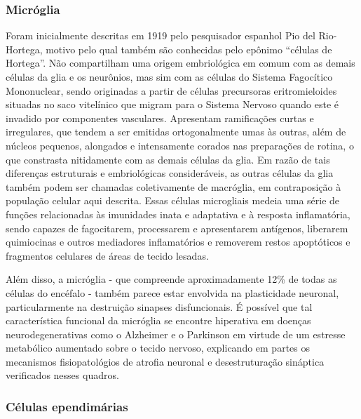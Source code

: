 \documentclass[
]{book}
\theoremstyle{definition}
\theoremstyle{definition}
\theoremstyle{definition}
\theoremstyle{definition}
\theoremstyle{remark}
\begin{document}
\hypertarget{micruxf3glia}{%
\subsubsection*{Micróglia}\label{micruxf3glia}}

Foram inicialmente descritas em 1919 pelo pesquisador espanhol Pio del Rio-Hortega, motivo pelo qual também são conhecidas pelo epônimo ``células de Hortega''. Não compartilham uma origem embriológica em comum com as demais células da glia e os neurônios, mas sim com as células do Sistema Fagocítico Mononuclear, sendo originadas a partir de células precursoras eritromieloides situadas no saco vitelínico que migram para o Sistema Nervoso quando este é invadido por componentes vasculares. Apresentam ramificações curtas e irregulares, que tendem a ser emitidas ortogonalmente umas às outras, além de núcleos pequenos, alongados e intensamente corados nas preparações de rotina, o que constrasta nitidamente com as demais células da glia. Em razão de tais diferenças estruturais e embriológicas consideráveis, as outras células da glia também podem ser chamadas coletivamente de macróglia, em contraposição à população celular aqui descrita. Essas células microgliais medeia uma série de funções relacionadas às imunidades inata e adaptativa e à resposta inflamatória, sendo capazes de fagocitarem, processarem e apresentarem antígenos, liberarem quimiocinas e outros mediadores inflamatórios e removerem restos apoptóticos e fragmentos celulares de áreas de tecido lesadas.

Além disso, a micróglia - que compreende aproximadamente 12\% de todas as células do encéfalo - também parece estar envolvida na plasticidade neuronal, particularmente na destruição sinapses disfuncionais. É possível que tal característica funcional da micróglia se encontre hiperativa em doenças neurodegenerativas como o Alzheimer e o Parkinson em virtude de um estresse metabólico aumentado sobre o tecido nervoso, explicando em partes os mecanismos fisiopatológios de atrofia neuronal e desestruturação sináptica verificados nesses quadros.

\hypertarget{cuxe9lulas-ependimuxe1rias}{%
\subsubsection*{Células ependimárias}\label{cuxe9lulas-ependimuxe1rias}}
\end{document}
